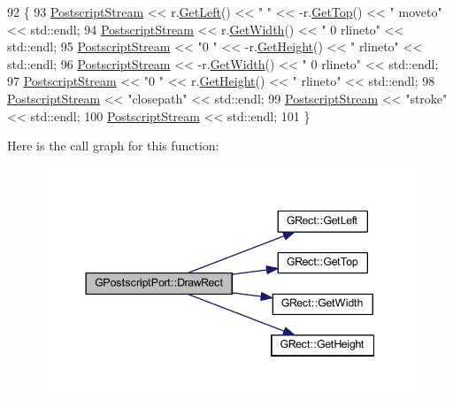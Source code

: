 \begin{DoxyCode}
92 \{
93     \mbox{\hyperlink{class_g_postscript_port_a0fb398f1c65b3ccb0efccd509f60d20d}{PostscriptStream}} << r.\mbox{\hyperlink{class_g_rect_a2095ad1d204b942a45bc8ed1546df937}{GetLeft}}() << \textcolor{stringliteral}{" "} << -r.\mbox{\hyperlink{class_g_rect_ac346895770ff4c98c672485a05819f55}{GetTop}}() << \textcolor{stringliteral}{" moveto"}     << 
      std::endl;
94     \mbox{\hyperlink{class_g_postscript_port_a0fb398f1c65b3ccb0efccd509f60d20d}{PostscriptStream}} << r.\mbox{\hyperlink{class_g_rect_af36a407452070f2e93a25dbafd3b4314}{GetWidth}}() << \textcolor{stringliteral}{" 0 rlineto"}                    << 
      std::endl;
95     \mbox{\hyperlink{class_g_postscript_port_a0fb398f1c65b3ccb0efccd509f60d20d}{PostscriptStream}} << \textcolor{stringliteral}{"0 "} << -r.\mbox{\hyperlink{class_g_rect_a8d2b0a2c06688c2dad74bd0789f57d73}{GetHeight}}() << \textcolor{stringliteral}{" rlineto"}           << 
      std::endl;
96     \mbox{\hyperlink{class_g_postscript_port_a0fb398f1c65b3ccb0efccd509f60d20d}{PostscriptStream}} << -r.\mbox{\hyperlink{class_g_rect_af36a407452070f2e93a25dbafd3b4314}{GetWidth}}() << \textcolor{stringliteral}{" 0 rlineto"}                   << 
      std::endl;
97     \mbox{\hyperlink{class_g_postscript_port_a0fb398f1c65b3ccb0efccd509f60d20d}{PostscriptStream}} << \textcolor{stringliteral}{"0 "} << r.\mbox{\hyperlink{class_g_rect_a8d2b0a2c06688c2dad74bd0789f57d73}{GetHeight}}() << \textcolor{stringliteral}{" rlineto"}                << 
      std::endl;
98     \mbox{\hyperlink{class_g_postscript_port_a0fb398f1c65b3ccb0efccd509f60d20d}{PostscriptStream}} << \textcolor{stringliteral}{"closepath"}                                     << std::endl;
99     \mbox{\hyperlink{class_g_postscript_port_a0fb398f1c65b3ccb0efccd509f60d20d}{PostscriptStream}} << \textcolor{stringliteral}{"stroke"}                                        << std::endl;
100     \mbox{\hyperlink{class_g_postscript_port_a0fb398f1c65b3ccb0efccd509f60d20d}{PostscriptStream}} << std::endl;
101 \}
\end{DoxyCode}
Here is the call graph for this function\+:\nopagebreak
\begin{figure}[H]
\begin{center}
\leavevmode
\includegraphics[width=344pt]{class_g_postscript_port_a2d69a564e11b54ee7d7878ad83b45707_cgraph}
\end{center}
\end{figure}
